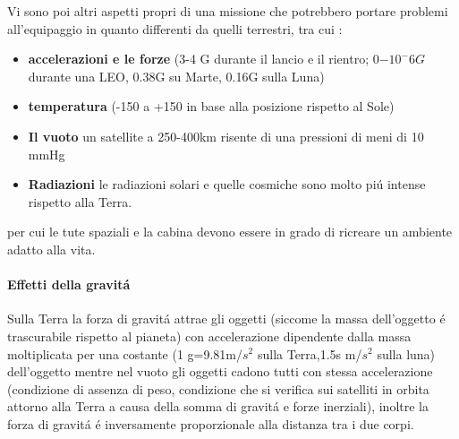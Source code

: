 \documentclass[10pt]{article}
\begin{document}
Vi sono poi altri aspetti propri di una missione che potrebbero portare problemi all'equipaggio in quanto differenti da quelli terrestri, tra cui :
\begin{itemize}
\item \textbf{accelerazioni e le forze} (3-4 G durante il lancio e il rientro; 0$-10^-6G$ durante una LEO, 0.38G su Marte, 0.16G sulla Luna)
\item \textbf{temperatura} (-150 a +150 in base alla posizione rispetto al Sole)
\item \textbf{Il vuoto}  \textrightarrow un satellite a 250-400km risente di una pressioni di meni di 10 mmHg
\item \textbf{Radiazioni} \textrightarrow le radiazioni solari e quelle cosmiche sono molto piú intense rispetto alla Terra.
\end{itemize}
 per cui le tute spaziali e la cabina devono essere in grado di ricreare un ambiente adatto alla vita.

\paragraph{Effetti della gravitá}

Sulla Terra la forza di gravitá attrae gli oggetti (siccome la massa dell'oggetto é trascurabile rispetto al pianeta) con accelerazione dipendente dalla massa moltiplicata per una costante (1 g=9.81m/$s^2$ sulla Terra,1.5s m/$s^2$ sulla luna) dell'oggetto mentre nel vuoto gli oggetti cadono tutti con stessa accelerazione (condizione di assenza di peso, condizione che si verifica sui satelliti in orbita attorno alla Terra a causa della somma di gravitá e forze inerziali), inoltre la forza di gravitá é inversamente proporzionale alla distanza tra i due corpi.
\end{document}
